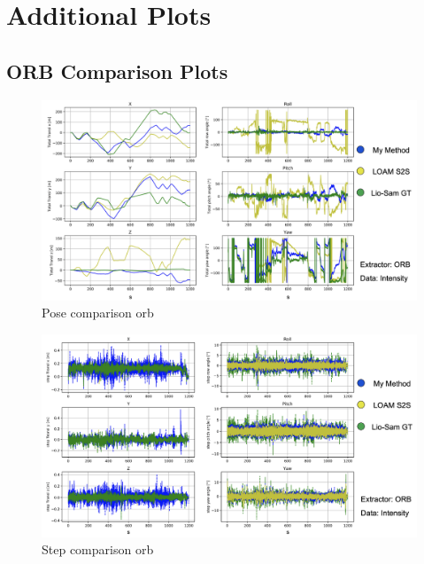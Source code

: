 \chapter{Additional Plots}\label{ch:additional_plots}


\section{ORB Comparison Plots}\label{sec:ORBcomp}{

    \begin{figure}[ht]
        \centering
        \includegraphics[scale = 0.25]{images/comparison_appendix/pose_orb.png}
        \caption{Pose comparison orb}
        \label{fig:pose_comparison_orb}
    \end{figure}
    \clearpage
    
    \begin{figure}[ht]
        \centering
        \includegraphics[scale = 0.25]{images/comparison_appendix/steps_orb.png}
        \caption{Step comparison orb}
        \label{fig:step_comparison_orb}
    \end{figure}

}
